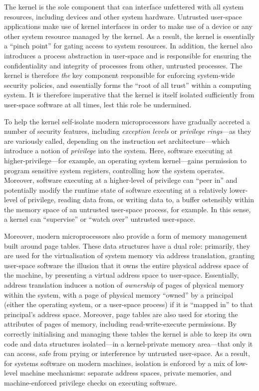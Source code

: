 \documentclass[a4paper, UKenglish, cleveref, autoref, thm-restate]{lipics-v2021}
\begin{document}
The kernel is the sole component that can interface unfettered with all system resources, including devices and other system hardware.
Untrusted user-space applications make use of kernel interfaces in order to make use of a device or any other system resource managed by the kernel.
As a result, the kernel is essentially a ``pinch point'' for gating access to system resources.
In addition, the kernel also introduces a process abstraction in user-space and is responsible for ensuring the confidentiality and integrity of processes from other, untrusted processes.
The kernel is therefore \emph{the} key component responsible for enforcing system-wide security policies, and essentially forms the ``root of all trust'' within a computing system.
It is therefore imperative that the kernel is itself isolated sufficiently from user-space software at all times, lest this role be undermined.

To help the kernel self-isolate modern microprocessors have gradually accreted a number of security features, including \emph{exception levels} or \emph{privilege rings}---as they are variously called, depending on the instruction set architecture---which introduce a notion of \emph{privilege} into the system.
Here, software executing at higher-privilege---for example, an operating system kernel---gains permission to program sensitive system registers, controlling how the system operates.
Moreover, software executing at a higher-level of privilege can ``peer in'' and potentially modify the runtime state of software executing at a relatively lower-level of privilege, reading data from, or writing data to, a buffer ostensibly within the memory space of an untrusted user-space process, for example.
In this sense, a kernel can ``supervise'' or ``watch over'' untrusted user-space.

Moreover, modern microprocessors also provide a form of memory management built around page tables.
These data structures have a dual role: primarily, they are used for the virtualisation of system memory via address translation, granting user-space software the illusion that it owns the entire physical address space of the machine, by presenting a virtual address space to user-space.
Essentially, address translation induces a notion of \emph{ownership} of pages of physical memory within the system, with a page of physical memory ``owned'' by a principal (either the operating system, or a user-space process) if it is ``mapped in'' to that principal's address space.
Moreover, page tables are also used for storing the attributes of pages of memory, including read-write-execute permissions.
By correctly initialising and managing these tables the kernel is able to keep its own code and data structures isolated---in a kernel-private memory area---that only it can access, safe from prying or interference by untrusted user-space.
As a result, for systems software on modern machines, isolation is enforced by a mix of low-level machine mechanisms: separate address spaces, private memories, and machine-enforced privilege checks on executing software.
\end{document}
